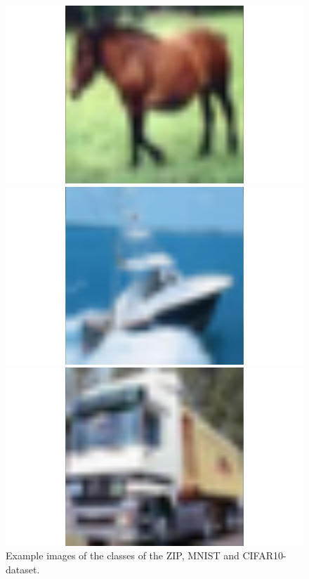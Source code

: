\begin{figure}
\begin{minipage}{0.32\textwidth}
\begin{minipage}{0.18\textwidth}
  \end{minipage}
  \begin{minipage}{0.18\textwidth}
    \includegraphics[width=1.2\textwidth]{../plots/cifar10-class7}
  \end{minipage}
  \begin{minipage}{0.18\textwidth}
    \includegraphics[width=1.2\textwidth]{../plots/cifar10-class8}
  \end{minipage}
  \begin{minipage}{0.18\textwidth}
    \includegraphics[width=1.2\textwidth]{../plots/cifar10-class9}
  \end{minipage}
 \end{minipage}
 \caption{Example images of the classes of the ZIP, MNIST and CIFAR10-dataset.}
\end{figure}

